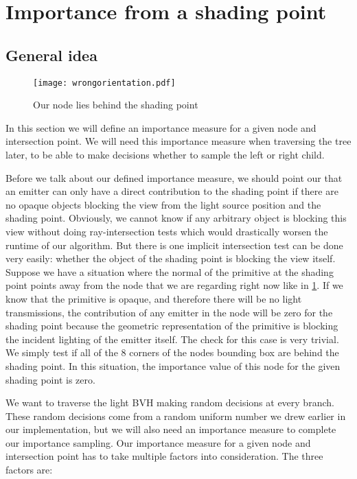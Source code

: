 \section{Importance from a shading point}
\label{sec:imp}

\subsection{General idea}

\begin{figure}
	\begin{center}
		\texttt{[image: wrongorientation.pdf]}
		\caption{Our node lies behind the shading point}
		\label{fig:wrongorientation}
	\end{center}
\end{figure}

In this section we will define an importance measure for a given node and intersection point. We will need this importance measure when traversing the tree later, to be able to make decisions whether to sample the left or right child.

Before we talk about our defined importance measure, we should point our that an emitter can only have a direct contribution to the shading point if there are no opaque objects blocking the view from the light source position and the shading point. Obviously, we cannot know if any arbitrary object is blocking this view without doing ray-intersection tests which would drastically worsen the runtime of our algorithm. But there is one implicit intersection test can be done very easily: whether the object of the shading point is blocking the view itself. Suppose we have a situation where the normal of the primitive at the shading point points away from the node that we are regarding right now like in \ref{fig:wrongorientation}. If we know that the primitive is opaque, and therefore there will be no light transmissions, the contribution of any emitter in the node will be zero for the shading point because the geometric representation of the primitive is blocking the incident lighting of the emitter itself. The check for this case is very trivial. We simply test if all of the 8 corners of the nodes bounding box are behind the shading point. In this situation, the importance value of this node for the given shading point is zero.

We want to traverse the light BVH making random decisions at every branch. These random decisions come from a random uniform number we drew earlier in our implementation, but we will also need an importance measure to complete our importance sampling. Our importance measure for a given node and intersection point has to take multiple factors into consideration. The three factors are:

